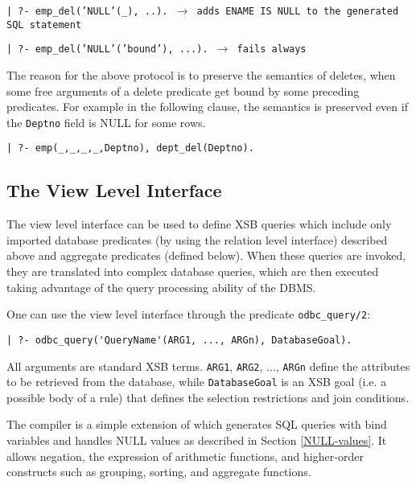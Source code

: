 \begin{center}
{\tt | ?- emp\_del('NULL'(\_), ..).  $\rightarrow$ adds ENAME IS NULL to the generated SQL statement}
\end{center}
\begin{center}

{\tt | ?- emp\_del('NULL'('bound'), ...).  $\rightarrow$ fails always}

\end{center}

The reason for the above protocol is to preserve the semantics of deletes, 
when some free arguments of a delete predicate get bound by some preceding
predicates.  For example in the following clause, the semantics is preserved 
even if the {\tt Deptno} field is NULL for some rows.

\begin{center}
{\tt | ?- emp(\_,\_,\_,\_,Deptno), dept\_del(Deptno).}
\end{center}

\subsection{The View Level Interface}

The view level interface can be used to define XSB queries which
include only imported database predicates (by using the relation level
interface) described above and aggregate predicates (defined below).
When these queries are invoked, they are translated into complex
database queries, which are then executed taking advantage of the
query processing ability of the DBMS.

One can use the view level interface through the predicate {\tt odbc\_query/2}:  
\begin{verbatim}
| ?- odbc_query('QueryName'(ARG1, ..., ARGn), DatabaseGoal).
\end{verbatim}
All arguments are standard XSB terms.  {\tt ARG1}, {\tt ARG2}, ...,
{\tt ARGn} define the attributes to be retrieved from the database,
while {\tt DatabaseGoal} is an XSB goal (i.e. a possible body of a
rule) that defines the selection restrictions and join conditions.

The compiler is a simple extension of \cite{Drax92} which generates SQL
queries with bind variables and handles NULL values as described in
Section \ref{NULL-values}.  It allows negation, the expression
of arithmetic functions, and higher-order constructs such as grouping,
sorting, and aggregate functions.

